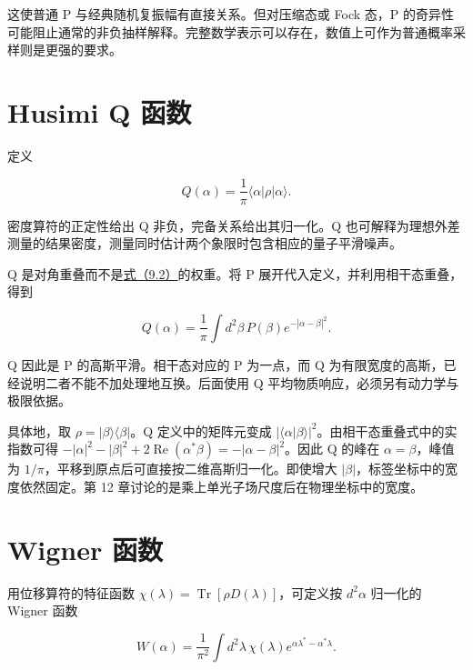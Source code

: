 \documentclass[UTF8,a4paper,zihao=-4,openany,fontset=fandol]{ctexbook}
\begin{document}
这使普通 P 与经典随机复振幅有直接关系。但对压缩态或 Fock 态，P 的奇异性可能阻止通常的非负抽样解释。完整数学表示可以存在，数值上可作为普通概率采样则是更强的要求。



\section{Husimi Q 函数}\label{sec:09:5}


定义



\begin{equation*}
Q(\alpha)=\frac1\pi\langle\alpha|\rho|\alpha\rangle.
\tag{9.5}\label{eq:9.5}
\end{equation*}


密度算符的正定性给出 Q 非负，完备关系给出其归一化。Q 也可解释为理想外差测量的结果密度，测量同时估计两个象限时包含相应的量子平滑噪声。



Q 是对角重叠而不是\hyperref[eq:9.2]{式（9.2）}的权重。将 P 展开代入定义，并利用相干态重叠，得到



\begin{equation*}
Q(\alpha)=\frac1\pi\int d^2\beta\,
P(\beta)e^{-|\alpha-\beta|^2}.
\tag{9.6}\label{eq:9.6}
\end{equation*}


Q 因此是 P 的高斯平滑。相干态对应的 P 为一点，而 Q 为有限宽度的高斯，已经说明二者不能不加处理地互换。后面使用 Q 平均物质响应，必须另有动力学与极限依据。



具体地，取 $\rho=|\beta\rangle\langle\beta|$。Q 定义中的矩阵元变成 $|\langle\alpha|\beta\rangle|^2$。由相干态重叠式中的实指数可得 $-|\alpha|^2-|\beta|^2+2\operatorname{Re}(\alpha^*\beta)=-|\alpha-\beta|^2$。因此 Q 的峰在 $\alpha=\beta$，峰值为 $1/\pi$，平移到原点后可直接按二维高斯归一化。即使增大 $|\beta|$，标签坐标中的宽度依然固定。第 12 章讨论的是乘上单光子场尺度后在物理坐标中的宽度。



\section{Wigner 函数}\label{sec:09:6}


用位移算符的特征函数 $\chi(\lambda)=\operatorname{Tr}[\rho D(\lambda)]$，可定义按 $d^2\alpha$ 归一化的 Wigner 函数



\begin{equation*}
W(\alpha)=\frac1{\pi^2}\int d^2\lambda\,
\chi(\lambda)e^{\alpha\lambda^*-\alpha^*\lambda}.
\tag{9.7}\label{eq:9.7}
\end{equation*}
\end{document}
